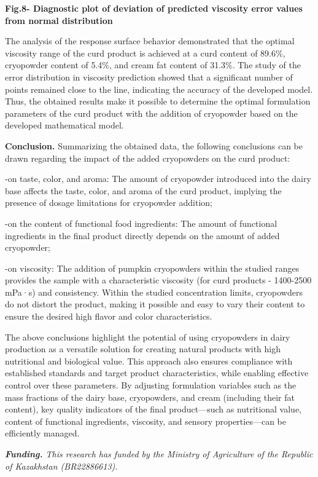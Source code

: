 {\bfseries Fig.8- Diagnostic plot of deviation of predicted viscosity
error values from normal distribution}

The analysis of the response surface behavior demonstrated that the
optimal viscosity range of the curd product is achieved at a curd
content of 89.6\%, cryopowder content of 5.4\%, and cream fat content of
31.3\%. The study of the error distribution in viscosity prediction
showed that a significant number of points remained close to the line,
indicating the accuracy of the developed model. Thus, the obtained
results make it possible to determine the optimal formulation parameters
of the curd product with the addition of cryopowder based on the
developed mathematical model.

{\bfseries Conclusion.} Summarizing the obtained data, the following
conclusions can be drawn regarding the impact of the added cryopowders
on the curd product:

-on taste, color, and aroma: The amount of cryopowder introduced into
the dairy base affects the taste, color, and aroma of the curd product,
implying the presence of dosage limitations for cryopowder addition;

-on the content of functional food ingredients: The amount of functional
ingredients in the final product directly depends on the amount of added
cryopowder;

-on viscosity: The addition of pumpkin cryopowders within the studied
ranges provides the sample with a characteristic viscosity (for curd
products - 1400-2500 mPa·s) and consistency. Within the studied
concentration limits, cryopowders do not distort the product, making it
possible and easy to vary their content to ensure the desired high
flavor and color characteristics.

The above conclusions highlight the potential of using cryopowders in
dairy production as a versatile solution for creating natural products
with high nutritional and biological value. This approach also ensures
compliance with established standards and target product
characteristics, while enabling effective control over these parameters.
By adjusting formulation variables such as the mass fractions of the
dairy base, cryopowders, and cream (including their fat content), key
quality indicators of the final product---such as nutritional value,
content of functional ingredients, viscosity, and sensory
properties---can be efficiently managed.

\emph{{\bfseries Funding.} This research has funded by the Ministry of
Agriculture of the Republic of Kazakhstan (BR22886613).}

